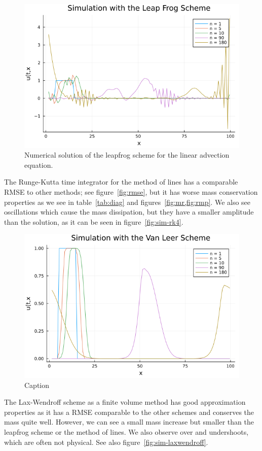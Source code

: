 \begin{figure}
    \centering
    \includegraphics[width=0.66\linewidth]{./images/rectangle-simulation-leapfrog.png}
    \caption{Numerical solution of the leapfrog scheme for the linear advection equation.}
    \label{fig:sim-leapfrog}
\end{figure}

The Runge-Kutta time integrator for the method of lines has a comparable RMSE to other methods;
see figure~\ref{fig:rmse}, but it has worse mass conservation properties as we see in
table~\ref{tab:diag} and figures~\cref{fig:mr,fig:rmp}. We also see oscillations which cause the
mass dissipation, but they have a smaller amplitude than the solution, as it can be seen in
figure~\ref{fig:sim-rk4}.

\begin{figure}
    \centering
    \includegraphics[width=0.66\linewidth]{./images/rectangle-simulation-vanleer.png}
    \caption{Caption}
    \label{fig:}
\end{figure}

The Lax-Wendroff scheme as a finite volume method has good approximation properties as it has a 
RMSE comparable to the other schemes and conserves the mass quite well. However, we can see a small
mass increase but smaller than the leapfrog scheme or the method of lines. We also observe 
over and undershoots, which are often not physical. See also figure~\cref{fig:sim-laxwendroff}.

